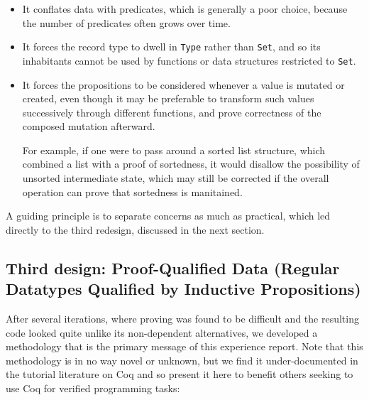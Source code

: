\documentclass{llncs}
\newif\ifdraft\drafttrue  %
\newcommand{\xcomment}[3]{\ifdraft\textcolor{#1}{[#2: #3]}\else\fi}
\newcommand{\gts}[1]{\xcomment{OliveGreen}{GTS}{#1}}
\begin{document}
\begin{itemize}
\item It conflates data with predicates, which is generally a poor choice,
  because the number of predicates often grows over time.

\item It forces the record type to dwell in \texttt{Type} rather than
  \texttt{Set}, and so its inhabitants cannot be used by functions or data
  structures restricted to \texttt{Set}.


\item It forces the propositions to be considered whenever a value is mutated
  or created, even though it may be preferable to transform such values
  successively through different functions, and prove correctness of the
  composed mutation afterward.

  For example, if one were to pass around a sorted list structure, which
  combined a list with a proof of sortedness, it would disallow the
  possibility of unsorted intermediate state, which may still be corrected if
  the overall operation can prove that sortedness is manitained.
\end{itemize}

A guiding principle is to separate concerns as much as practical, which led
directly to the third redesign, discussed in the next section.  

\subsection{Third design: Proof-Qualified Data (Regular Datatypes Qualified by
  Inductive Propositions)}
\label{sec:splitdesign}

After several iterations, where proving was found to be difficult and
the resulting code looked quite unlike its non-dependent alternatives,
we developed a methodology that is the primary message of this
experience report.  Note that this methodology is in no way novel or
unknown, but we find it under-documented in the tutorial literature on
Coq and so present it here to benefit others seeking to use Coq for
verified programming tasks:
\end{document}
